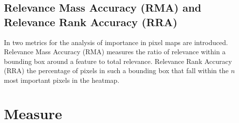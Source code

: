\subsection{Relevance Mass Accuracy (RMA) and Relevance Rank Accuracy (RRA)}
In \cite{Arras2022} two metrics for the analysis of importance in pixel maps are introduced. Relevance Mass Accuracy (RMA) measures the ratio of relevance within a bounding box around a feature to total relevance. Relevance Rank Accuracy (RRA) the percentage of pixels in such a bounding box that fall within the $n$ most important pixels in the heatmap.

\section{Measure}\label{section:measure}



